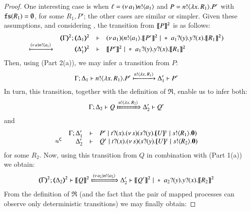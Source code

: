 \begin{proof}
\smallskip

One interesting case is when $\ell = (\nu\, a_1)n ! \langle a_1 \rangle$ and 
$P = n ! \langle \lambda x.\,R_1 \rangle . P'$ with {$\mathtt{fs}(R_1) = \emptyset$}, for some $R_1, P'$; the other cases are similar or simpler. 
Given these assumptions, and considering , the transition from $\llbracket P\rrbracket^\mathtt{2}$ is as follows:
%
$$
	\mhorel	{\tmap{\Gamma}{2}}
		{\tmap{\Delta_1}{2}}
		{\news{a_1}(\bout{n}{a_1} \pmap{P'}{2} \Par \repl{\binp{a_1}{y} \binp{y}{x} \pmap{R_1}{2}})}
		{\hby{\news{a}\bactout{n}{a_1}}}
		{\tmap{\Delta_1'}{2}}
		{}
		{\pmap{P'}{2} \Par \repl{\binp{a_1}{y} \binp{y}{x} \pmap{R_1}{2}}}
$$
Then, using 
 (Part 2(a)), 
we may infer a transition from $P$:
$$\Gamma; \Delta_1 \vdash n ! \langle \lambda x.\,R_1 \rangle . P'
		\xmapsto{n !\langle \lambda x.\,R_1 \rangle}
		\Delta_1' \vdash P'$$
In turn, this transition, together with the definition of 
$\Re$, enable us to infer both:
	\begin{eqnarray*}
		\Gamma; \Delta_2 \proves Q
		\Hby{\bactout{n}{\abs{x}{R_2}}}
		\Delta_2' \proves Q'
	\end{eqnarray*}
	and
	$$
	\mhorel
		{\Gamma}
		{\Delta_1'}
		{P' \Par \binp{t}{x} \newsp{s}{ \binp{s}{y} \mapchar{U}{y} \Par \bout{s}{R_1} \inact }}
		{\fwb}
		{\Delta_2'} 
		{}
		{Q' \Par \binp{t}{x} \newsp{s}{ \binp{s}{y} \mapchar{U}{y} \Par \bout{s}{R_2} \inact }}
$$
for some $R_2$.
	Now, using this transition from $Q$ in combination with  (Part 1(a)) we obtain:
%	
	\begin{eqnarray*}
		\tmap{\Gamma}{2};   \tmap{\Delta_2}{2} \proves \pmap{Q}{2}
		\Hby{\news{a_2}\bactout{n}{a_2}}
		\Delta_2' \proves \pmap{Q'}{2} \Par \repl{\binp{a_2}{y} \binp{y}{x} \pmap{R_2}{2}}
	\end{eqnarray*}
From the definition of $\Re$ (and the fact that the pair
	of mapped processes can observe only deterministic transitions) we may finally obtain:


\end{proof}
